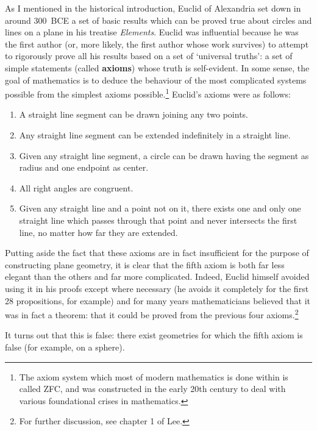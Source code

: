 \documentclass[a4paper,leqno,10pt]{article}
\theoremstyle{exercise}
\theoremstyle{plain}
\theoremstyle{definition}
\theoremstyle{remark}
\newcommand{\df}{\textbf}
\begin{document}
As I mentioned in the historical introduction, Euclid of Alexandria set down in around 300~BCE a set of basic results
which can be proved true about circles and lines on a plane in his treatise \textit{Elements}.
Euclid was influential because he was the first author (or, more likely, the first author whose work survives) to
attempt to rigorously prove all his results based on a set of `universal truths': a set of simple statements (called
\df{axioms}) whose truth is self-evident. In some sense, the goal of mathematics is to deduce the behaviour of the
most complicated systems possible from the simplest axioms possible.\footnote{The axiom system which most of modern
mathematics is done within is called ZFC, and was constructed in the early 20th century to deal with various foundational
crises in mathematics.} Euclid's axioms were as follows:
\begin{enumerate}
  \item A straight line segment can be drawn joining any two points.
  \item Any straight line segment can be extended indefinitely in a straight line.
  \item Given any straight line segment, a circle can be drawn having the segment as radius and one endpoint as center.
  \item All right angles are congruent.
  \item Given any straight line and a point not on it, there exists one and only one straight line which passes through
        that point and never intersects the first line, no matter how far they are extended.
\end{enumerate}
Putting aside the fact that these axioms are in fact insufficient for the purpose of constructing plane geometry, it is
clear that the fifth axiom is both far less elegant than the others and far more complicated. Indeed, Euclid himself avoided
using it in his proofs except where necessary (he avoids it completely for the first 28 propositions, for example) and for
many years mathematicians believed that it was in fact a theorem: that it could be proved from the previous four axioms.\footnote{For
further discussion, see chapter 1 of Lee.}

It turns out that this is false: there exist geometries for which the fifth axiom is false (for example, on a sphere).
\end{document}

